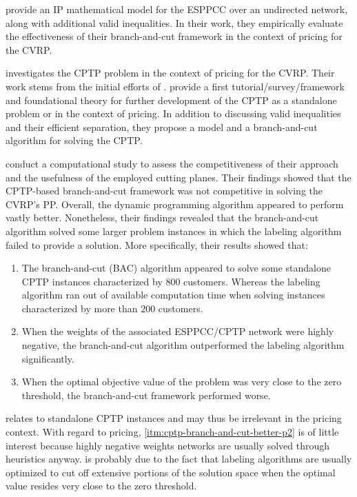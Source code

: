 \medskip

\textcite{jepsen2008branchandcut} provide an IP mathematical model
for the ESPPCC over an undirected network, along with additional valid inequalities.
In their work, they empirically evaluate the effectiveness of their
branch-and-cut framework in the context of pricing for the CVRP.

\textcite{jepsen2014} investigates the CPTP problem in the context of pricing for the CVRP.
Their work stems from the initial efforts of \textcite{jepsen2008branchandcut}.
\citeauthor{jepsen2014} provide a first tutorial/survey/framework and foundational theory
for further development of the CPTP as a standalone problem or in the context of pricing.
In addition to discussing valid inequalities and their efficient separation,
they propose a model and a branch-and-cut algorithm for solving the CPTP.

\textcite{jepsen2014} conduct a computational study
to assess the competitiveness of their approach
and the usefulness of the employed cutting planes.
Their findings showed that the CPTP-based branch-and-cut framework
was not competitive in solving the CVRP's PP.
Overall, the dynamic programming algorithm appeared to perform vastly better.
Nonetheless, their findings revealed that the branch-and-cut algorithm
solved some larger problem instances in which the labeling algorithm failed to provide a solution.
More specifically, their results showed that:
\begin{enumerate}
	\setlength{\itemsep}{0pt}
	\setlength{\parskip}{0pt}

	\item \label{itm:cptp-branch-and-cut-better-p1}
	      The branch-and-cut (BAC) algorithm appeared to solve some standalone CPTP instances characterized by $800$ customers.
	      Whereas the labeling algorithm ran out of available computation time when solving instances characterized by more than $200$ customers.
	\item \label{itm:cptp-branch-and-cut-better-p2} When the weights of the associated
	      ESPPCC/CPTP network were highly negative,
	      the branch-and-cut algorithm outperformed the labeling algorithm significantly.
	\item \label{itm:cptp-branch-and-cut-better-p3} When the optimal objective value
	      of the problem was very close to the zero threshold,
	      the branch-and-cut framework performed worse.
\end{enumerate}
 relates to standalone CPTP instances and may thus be irrelevant in the pricing context.
With regard to pricing, \cref{itm:cptp-branch-and-cut-better-p2} is of little interest because highly negative weights networks are usually solved through heuristics anyway.
 is probably due to the fact that labeling algorithms are usually optimized to cut off extensive portions of the solution space when the optimal value resides very close to the zero threshold.

